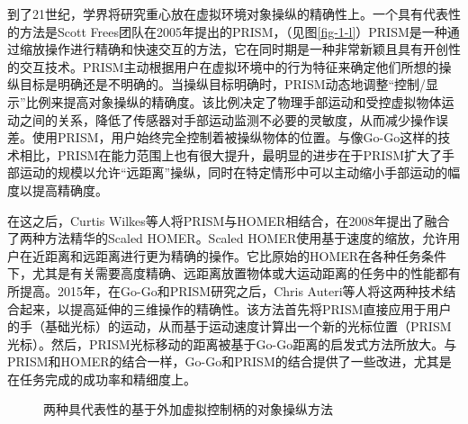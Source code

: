 到了21世纪，学界将研究重心放在虚拟环境对象操纵的精确性上。一个具有代表性的方法是Scott Frees团队在2005年提出的PRISM，（见图\ref{fig-1-l}）PRISM是一种通过缩放操作进行精确和快速交互的方法，它在同时期是一种非常新颖且具有开创性的交互技术。PRISM主动根据用户在虚拟环境中的行为特征来确定他们所想的操纵目标是明确还是不明确的。当操纵目标明确时，PRISM动态地调整“控制/显示”比例来提高对象操纵的精确度。该比例决定了物理手部运动和受控虚拟物体运动之间的关系，降低了传感器对手部运动监测不必要的灵敏度，从而减少操作误差。使用PRISM，用户始终完全控制着被操纵物体的位置。与像Go-Go这样的技术相比，PRISM在能力范围上也有很大提升，最明显的进步在于PRISM扩大了手部运动的规模以允许“远距离”操纵，同时在特定情形中可以主动缩小手部运动的幅度以提高精确度。

在这之后，Curtis Wilkes等人将PRISM与HOMER相结合，在2008年提出了融合了两种方法精华的Scaled HOMER\cite{2008Curtis}。Scaled HOMER使用基于速度的缩放，允许用户在近距离和远距离进行更为精确的操作。它比原始的HOMER在各种任务条件下，尤其是有关需要高度精确、远距离放置物体或大运动距离的任务中的性能都有所提高。2015年，在Go-Go和PRISM研究之后，Chris Auteri等人将这两种技术结合起来，以提高延伸的三维操作的精确性。该方法首先将PRISM直接应用于用户的手（基础光标）的运动，从而基于运动速度计算出一个新的光标位置（PRISM光标）。然后，PRISM光标移动的距离被基于Go-Go距离的启发式方法所放大。与 PRISM和HOMER的结合一样，Go-Go和PRISM的结合提供了一些改进，尤其是在任务完成的成功率和精细度上。

\begin{figure}[t!]
    \centering
    \hspace{5em} %
    \caption{两种具代表性的基于外加虚拟控制柄的对象操纵方法}
    \label{fig-3}
\end{figure}

